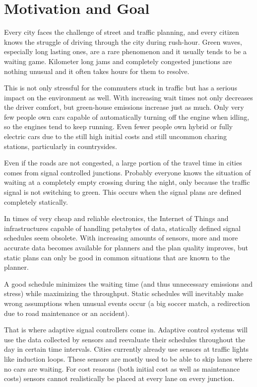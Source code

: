 \section{Motivation and Goal}

Every city faces the challenge of street and traffic planning, and every citizen knows the struggle of driving through the city during rush-hour. Green waves, especially long lasting ones, are a rare phenomenon and it usually tends to be a waiting game. Kilometer long jams and completely congested junctions are nothing unusual and it often takes hours for them to resolve.

This is not only stressful for the commuters stuck in traffic but has a serious impact on the environment as well.
With increasing wait times not only decreases the driver comfort, but green-house emissions increase just as much. Only very few people own cars capable of automatically turning off the engine when idling, so the engines tend to keep running. Even fewer people own hybrid or fully electric cars due to the still high initial costs and still uncommon charing stations, particularly in countrysides.

Even if the roads are not congested, a large portion of the travel time in cities comes from signal controlled junctions. Probably everyone knows the situation of waiting at a completely empty crossing during the night, only because the traffic signal is not switching to green.
This occurs when the signal plans are defined completely statically.

In times of very cheap and reliable electronics, the Internet of Things and infrastructures capable of handling petabytes of data, statically defined signal schedules seem obsolete.
With increasing amounts of sensors, more and more accurate data becomes available for planners and the plan quality improves, but static plans can only be good in common situations that are known to the planner.

A good schedule minimizes the waiting time (and thus unnecessary emissions and stress) while maximizing the throughput. Static schedules will inevitably make wrong assumptions when unusual events occur (a big soccer match, a redirection due to road maintenance or an accident).

That is where adaptive signal controllers come in. Adaptive control systems will use the data collected by sensors and reevaluate their schedules throughout the day in certain time intervals.
Cities currently already use sensors at traffic lights like induction loops.
These sensors are mostly used to be able to skip lanes where no cars are waiting. For cost reasons (both initial cost as well as maintenance costs) sensors cannot realistically be placed at every lane on every junction.

